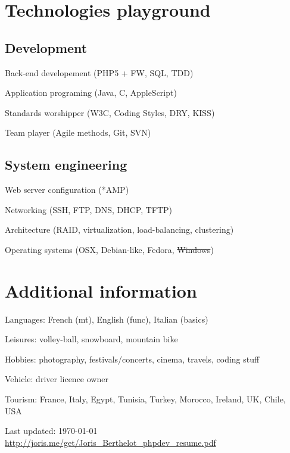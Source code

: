 \documentclass[letterpaper]{article}
\def\footerlink{http://joris.me/get/Joris\_Berthelot\_phpdev\_resume.pdf}
\renewenvironment{itemize}{
    \begin{list}{}{
        \setlength{\leftmargin}{1.5em}
    }
}{
    \end{list}
}
\begin{document}
    \section*{Technologies playground}
        
        \subsection*{Development}
            
            \begin{itemize}
                \item Back-end developement (PHP5 + FW, SQL, TDD)
                \item Application programing (Java, C, AppleScript)
                \item Standards worshipper (W3C, Coding Styles, DRY, KISS)
                \item Team player (Agile methods, Git, SVN)
            \end{itemize}
            
        \subsection*{System engineering}
            
            \begin{itemize}
                \item Web server configuration (*AMP)
                \item Networking (SSH, FTP, DNS, DHCP, TFTP)
                \item Architecture (RAID, virtualization, load-balancing, clustering)
                \item Operating systems (OSX, Debian-like, Fedora, \sout{Windows})
            \end{itemize}
            
    \section*{Additional information}
        
        \begin{itemize}
            \item Languages: French (mt), English (func), Italian (basics)
            \item Leisures: volley-ball, snowboard, mountain bike
            \item Hobbies: photography, festivals/concerts, cinema, travels, coding stuff
            \item Vehicle: driver licence owner
            \item Tourism: France, Italy, Egypt, Tunisia, Turkey, Morocco, Ireland, UK, Chile, USA
        \end{itemize}
        
    \vfill
    
    \begin{center}
        \begin{footnotesize}
            Last updated: \today \\
            \href{\footerlink}{ \footerlink}
        \end{footnotesize}
    \end{center}
\end{document}
